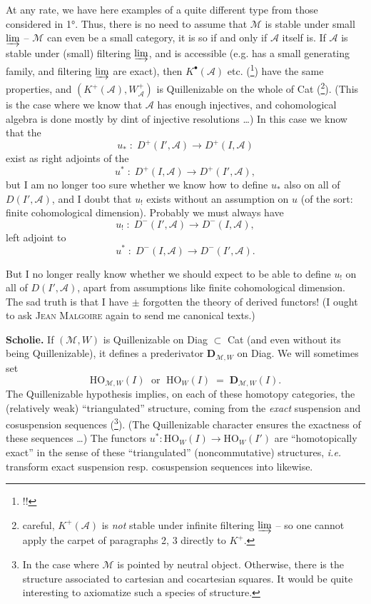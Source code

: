 \documentclass[11pt]{article}
\newcommand{\printedpage}[1]{\marginpar{\footnotesize p.~#1}}
\newcommand{\msp}[1]{\marginpar{\footnotesize [#1]}}
\begin{document}
\msp{page 53}At any rate, we have here examples of a quite different type from those considered in 1°. Thus, there is no need to assume that $\mathcal{M}$ is stable under small $\varinjlim$ -- $\mathcal{M}$ can even be a small category, it is so if and only if $\mathcal{A}$ itself is. If $\mathcal{A}$ is stable under (small) filtering $\varinjlim$, and is accessible (e.g. has a small generating family, and filtering $\varinjlim$ are exact), then $K^{\bullet}(\mathcal{A})$ etc. (\footnote[30]{!!}) have the same properties, and $(K^{+}(\mathcal{A}),W_{\mathcal{A}}^{+})$ is Quillenizable on the whole of Cat (\footnote[31]{careful, $K^{+}(\mathcal{A})$ is \textit{not} stable under infinite filtering $\varinjlim$ -- so one cannot apply the carpet of paragraphs 2, 3 directly to $K^{+}$.}). (This is the case where we know that $\mathcal{A}$ has enough injectives, and cohomological algebra is done mostly by dint of injective resolutions \dots) In this case we know that the %
\[ u_{*} \;:\; D^{+}(I',\mathcal{A}) \longrightarrow D^{+}(I,\mathcal{A}) \]
exist as right adjoints of the
\[ u^{*} \;:\; D^{+}(I,\mathcal{A}) \longrightarrow D^{+}(I',\mathcal{A}), \]
but I am no longer too sure whether we know how to define $u_{*}$ also on all of $D(I',\mathcal{A})$, and I doubt that $u_{!}$ exists without an assumption on $u$ (of the sort: finite cohomological dimension). Probably we must always have
\[ u_{!} \;:\; D^{-}(I',\mathcal{A}) \longrightarrow D^{-}(I,\mathcal{A}), \]
\msp{page 54}left adjoint to
\[ u^{*} \;:\; D^{-}(I,\mathcal{A}) \longrightarrow D^{-}(I',\mathcal{A}). \]

\printedpage{31}
But I no longer really know whether we should expect to be able to define $u_{!}$ on all of $D(I',\mathcal{A})$, apart from assumptions like finite cohomological dimension. The sad truth is that I have $\pm$ forgotten the theory of derived functors! (I ought to ask \textsc{Jean Malgoire} again to send me canonical texts.)

\textbf{Scholie.} If $(\mathcal{M},W)$ is Quillenizable on Diag $\subset$ Cat (and even without its being Quillenizable), it defines a prederivator $\mathbf{D}_{\mathcal{M},W}$ on Diag. We will sometimes set
\[ \mathrm{HO}_{\mathcal{M},W}(I) \;\text{ or }\; \mathrm{HO}_{W}(I) \;=\; \mathbf{D}_{\mathcal{M},W}(I). \]
The Quillenizable hypothesis implies, on each of these homotopy categories, the (relatively weak) ``triangulated'' structure, coming from the \textit{exact} suspension and cosuspension sequences (\footnote[32]{In the case where $\mathcal{M}$ is pointed by neutral object. Otherwise, there is the structure associated to cartesian and cocartesian squares. It would be quite interesting to axiomatize such a species of structure.}). (The Quillenizable character ensures the exactness of these sequences \dots) The functors $u^{*} : \mathrm{HO}_{W}(I) \longrightarrow \mathrm{HO}_{W}(I')$
\msp{page 55}are ``homotopically exact'' in the sense of these ``triangulated'' (noncommutative) structures, \textit{i.e.} transform exact suspension resp. cosuspension sequences into likewise. %
\end{document}
